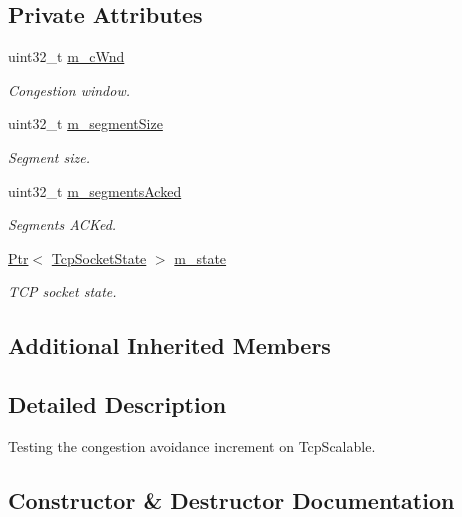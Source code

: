 \subsection*{Private Attributes}
\begin{DoxyCompactItemize}
\item 
uint32\+\_\+t \hyperlink{classTcpScalableIncrementTest_aebed656e82b5ef378398041ab9cc13d7}{m\+\_\+c\+Wnd}
\begin{DoxyCompactList}\small\item\em Congestion window. \end{DoxyCompactList}\item 
uint32\+\_\+t \hyperlink{classTcpScalableIncrementTest_a68b87b3ea5d26df154b3ce7ae0cf3a7c}{m\+\_\+segment\+Size}
\begin{DoxyCompactList}\small\item\em Segment size. \end{DoxyCompactList}\item 
uint32\+\_\+t \hyperlink{classTcpScalableIncrementTest_aa174cee1d0796100acce381c38c0d453}{m\+\_\+segments\+Acked}
\begin{DoxyCompactList}\small\item\em Segments A\+C\+Ked. \end{DoxyCompactList}\item 
\hyperlink{classns3_1_1Ptr}{Ptr}$<$ \hyperlink{classns3_1_1TcpSocketState}{Tcp\+Socket\+State} $>$ \hyperlink{classTcpScalableIncrementTest_a872e97f9b38599ef388c3734b42219ed}{m\+\_\+state}
\begin{DoxyCompactList}\small\item\em T\+CP socket state. \end{DoxyCompactList}\end{DoxyCompactItemize}
\subsection*{Additional Inherited Members}


\subsection{Detailed Description}
Testing the congestion avoidance increment on Tcp\+Scalable. 

\subsection{Constructor \& Destructor Documentation}

